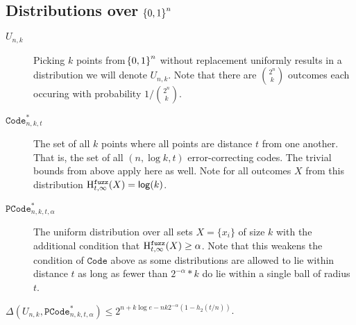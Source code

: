 \subsection{Distributions over $\!\left\{ 0,1 \right\}^{n}$}
\begin{description}
    \item[$U_{n,k}$] Picking $k$ points from $\!\left\{ 0,1 \right\}^{n}$ without replacement uniformly results in a distribution we will denote $U_{n,k}$. Note that there are ${2^{n}\choose k}$ outcomes each occuring with probability $1/{2^{n}\choose k}$.

    \item[$\mathtt{Code}_{n,k,t}^{*}$] The set of all $k$ points where all points are distance $t$ from one another.  That is, the set of all $(n,\log k, t)$ error-correcting codes. The trivial bounds from above apply here as well.  Note for all outcomes $X$ from this distribution $\mathrm{H}^{\mathtt{fuzz}}_{t,\infty}(X) = \mathsf{log}\!\left(k\right)$.
    
    \item[$\mathtt{PCode}_{n, k, t, \alpha}^{*}$] The uniform distribution over all sets $X = \{x_i\}$ of size $k$ with the additional condition that $\mathrm{H}^{\mathtt{fuzz}}_{t,\infty}(X) \ge \alpha$.  Note that this weakens the condition of $\mathtt{Code}$ above as some distributions are allowed to lie within distance $t$ as long as fewer than $2^{-\alpha}*k$ do lie within a single ball of radius $t$.
\end{description}
 
 
 \begin{lemma}
 \label{lem:close family}
 $\Delta(U_{n,k}, \mathtt{PCode}_{n, k, t, \alpha}^{*}) \le 2^{n+k\log e- nk2^{-\alpha}(1-h_2(t/n))}$.
 \end{lemma}
 
